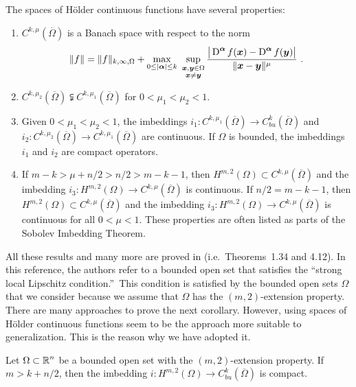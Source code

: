 The spaces of Hölder continuous functions have several properties:
\begin{enumerate}
\item $\displaystyle C^{k,\mu}(\overline{\Omega})$ is a Banach space
with respect to the norm
\[
\|f\| = \|f\|_{k,\infty,\Omega} + \max_{0\leq |{\bm{\alpha}}|\leq k}
\ \sup_{\substack{{\bm{x}},{\bm{y}} \in \Omega\\ {\bm{x}} \neq {\bm{y}}}}
\frac{\big|\operatorname{D}^{{\bm{\alpha}}} f({\bm{x}}) - \operatorname{D}^{{\bm{\alpha}}} f({\bm{y}})\big|}
{\|{\bm{x}}-{\bm{y}}\|^{\mu}} \ .
\]
\item $\displaystyle C^{k,\mu_2}(\overline{\Omega})
\subsetneqq C^{k,\mu_1}(\overline{\Omega})$ for $0 < \mu_1 < \mu_2 < 1$.
\item Given $0 < \mu_1 < \mu_2 < 1$, the imbeddings
$\displaystyle i_1 : C^{k,\mu_1}(\overline{\Omega})
\to C_{bu}^k(\overline{\Omega})$
and
$\displaystyle i_2 : C^{k,\mu_2}(\overline{\Omega})
\to C^{k,\mu_1}(\overline{\Omega})$
are continuous.  If $\Omega$ is bounded, the imbeddings $i_1$ and
$i_2$ are compact operators.
\item If $m-k > \mu + n/2 > n/2 > m-k-1$, then
$\displaystyle H^{m,2}(\Omega) \subset C^{k,\mu}(\overline{\Omega})$
and the imbedding
$\displaystyle i_3: H^{m,2}(\Omega) \to C^{k,\mu}(\overline{\Omega})$
is continuous.  If $n/2 = m-k-1$, then
$\displaystyle H^{m,2}(\Omega) \subset C^{k,\mu}(\overline{\Omega})$
and the imbedding
$\displaystyle i_3: H^{m,2}(\Omega) \to C^{k,\mu}(\overline{\Omega})$
is continuous for all $0<\mu<1$.  These properties are often listed
as parts of the Sobolev Imbedding Theorem.
\end{enumerate}
All these results and many more are proved in \cite{Ad} (i.e.\ Theorems~1.34
and 4.12).  In this reference, the authors refer to a bounded open set
that satisfies the ``strong local Lipschitz condition.''\ This
condition is satisfied
by the bounded open sets $\Omega$ that we consider because we assume
that $\Omega$ has the $(m,2)$-extension property.
There are many approaches to prove the next corollary.  However, using spaces of
Hölder continuous functions seem to be the approach more suitable to
generalization.  This is the reason why we have adopted it.

\begin{cor} \label{sob_cor_sob_lem}
Let $\displaystyle \Omega \subset \mathbb{R}^n$ be a bounded open set with
the $(m,2)$-extension property. If $m>k +n/2$, then the imbedding
$\displaystyle i:H^{m,2}(\Omega) \to C_{bu}^k(\overline{\Omega})$
is compact.
\end{cor}

